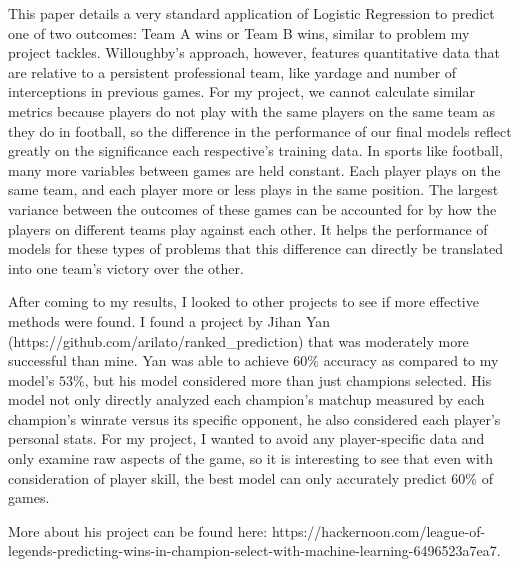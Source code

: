 \documentclass[11pt]{article}
\begin{document}
This paper details a very standard application of Logistic Regression to
predict one of two outcomes: Team A wins or Team B wins, similar to
problem my project tackles. Willoughby's approach, however, features
quantitative data that are relative to a persistent professional team,
like yardage and number of interceptions in previous games. For my
project, we cannot calculate similar metrics because players do not play
with the same players on the same team as they do in football, so the
difference in the performance of our final models reflect greatly on the
significance each respective's training data. In sports like football,
many more variables between games are held constant. Each player plays
on the same team, and each player more or less plays in the same
position. The largest variance between the outcomes of these games can
be accounted for by how the players on different teams play against each
other. It helps the performance of models for these types of problems
that this difference can directly be translated into one team's victory
over the other.

After coming to my results, I looked to other projects to see if more
effective methods were found. I found a project by Jihan Yan
(https://github.com/arilato/ranked\_prediction) that was moderately more
successful than mine. Yan was able to achieve \(60\%\) accuracy as
compared to my model's \(53\%\), but his model considered more than just
champions selected. His model not only directly analyzed each champion's
matchup measured by each champion's winrate versus its specific
opponent, he also considered each player's personal stats. For my
project, I wanted to avoid any player-specific data and only examine raw
aspects of the game, so it is interesting to see that even with
consideration of player skill, the best model can only accurately
predict \(60\%\) of games.

More about his project can be found here:
https://hackernoon.com/league-of-legends-predicting-wins-in-champion-select-with-machine-learning-6496523a7ea7.
\end{document}
